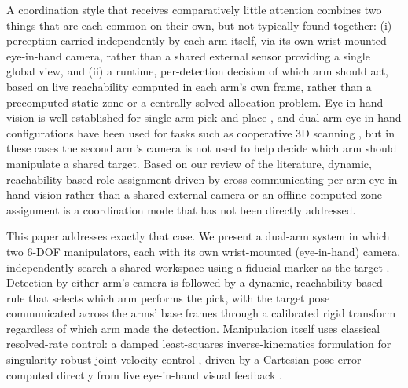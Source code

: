 \documentclass[letterpaper, 10 pt, conference]{ieeeconf}  %
\begin{document}
A coordination style that receives comparatively little attention combines two things that are each common on their own, but not typically found together: (i) perception carried independently by each arm itself, via its own wrist-mounted eye-in-hand camera,
rather than a shared external sensor providing a single global view, and (ii) a runtime, per-detection decision of which arm should act, based on live reachability computed in each arm's own frame, rather than a precomputed static zone or a centrally-solved allocation problem. Eye-in-hand vision is well established for single-arm pick-and-place \cite{nguyen2025vision}, and dual-arm eye-in-hand configurations have been used
for tasks such as cooperative 3D scanning \cite{kobayashi2022obtaining}, but in these cases the second arm's camera is not used to help decide which arm should manipulate a shared target. Based on
our review of the literature, dynamic, reachability-based role assignment driven by cross-communicating per-arm eye-in-hand vision rather than a shared external camera or an offline-computed zone assignment is a coordination mode that has not been directly addressed. 

This paper addresses exactly that case. We present a dual-arm system in which two 6-DOF manipulators, each with its own wrist-mounted (eye-in-hand) camera, independently search a shared workspace using a fiducial marker as the target \cite{garrido2014automatic}. Detection by either
arm's camera is followed by a dynamic, reachability-based rule that selects which arm
performs the pick, with the target pose communicated across the arms' base frames
through a calibrated rigid transform regardless of which arm made the detection.
Manipulation itself uses classical resolved-rate control: a damped least-squares
inverse-kinematics formulation for singularity-robust joint velocity control \cite{nakamura1986inverse, chiaverini1994review}, driven by a Cartesian pose error computed directly from live eye-in-hand visual
feedback \cite{hutchinson1996tutorial}. 
\end{document}
